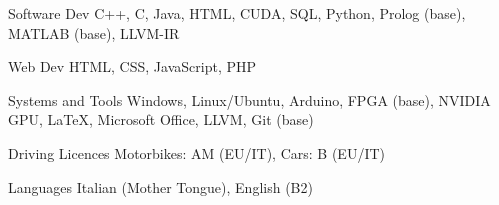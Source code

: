 
\begin{cvskills}

\cvskill
{Software Dev} %
{C++, C, Java, HTML, CUDA, SQL, Python, Prolog (base), MATLAB (base), LLVM-IR} %

\cvskill
{Web Dev} %
{HTML, CSS, JavaScript, PHP} %

\cvskill
{Systems and Tools} %
{Windows, Linux/Ubuntu, Arduino, FPGA (base), NVIDIA GPU, LaTeX, Microsoft Office, LLVM, Git (base)} %

\cvskill
{Driving Licences} %
{Motorbikes: AM (EU/IT), Cars: B (EU/IT)} %

\cvskill
{Languages} %
{Italian (Mother Tongue), English (B2)} %

\end{cvskills}
